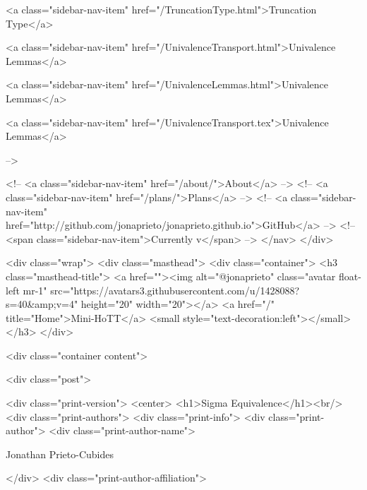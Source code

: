       
    
      
        
          <a class="sidebar-nav-item" href="/TruncationType.html">Truncation Type</a>
        
      
    
      
        
          <a class="sidebar-nav-item" href="/UnivalenceTransport.html">Univalence Lemmas</a>
        
      
    
      
        
          <a class="sidebar-nav-item" href="/UnivalenceLemmas.html">Univalence Lemmas</a>
        
      
    
      
        
          <a class="sidebar-nav-item" href="/UnivalenceTransport.tex">Univalence Lemmas</a>
        
      
     -->

    <!-- <a class="sidebar-nav-item" href="/about/">About</a> -->
    <!-- <a class="sidebar-nav-item" href="/plans/">Plans</a> -->
    <!-- <a class="sidebar-nav-item" href="http://github.com/jonaprieto/jonaprieto.github.io">GitHub</a> -->
    <!-- <span class="sidebar-nav-item">Currently v</span> -->
  </nav>
</div>

    <div class="wrap">
      <div class="masthead">
        <div class="container">
          <h3 class="masthead-title">
            <a href=""><img alt="@jonaprieto" class="avatar float-left mr-1" src="https://avatars3.githubusercontent.com/u/1428088?s=40&amp;v=4" height="20" width="20"></a>
            <a href="/" title="Home">Mini-HoTT</a>
            <small style="text-decoration:left"></small>
          </h3>
        </div>
      
      <div class="container content">
        







<div class="post">

  <div class="print-version">
    <center>
      <h1>Sigma Equivalence</h1><br/>
        <div class="print-authors">
          <div class="print-info">
            <div class="print-author">
              <div class="print-author-name">
                
                  Jonathan Prieto-Cubides
                
              </div>
              <div class="print-author-affiliation">
                
